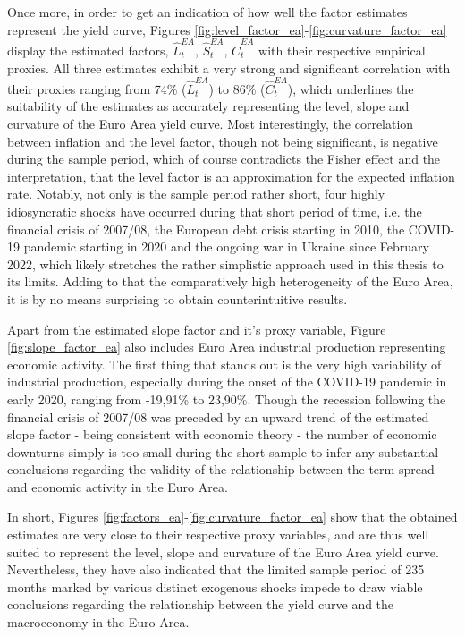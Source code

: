 Once more, in order to get an indication of how well the factor estimates represent the yield curve, Figures \ref{fig:level_factor_ea}-\ref{fig:curvature_factor_ea} display the estimated factors, $\hat{L}^{EA}_{t}$, $\hat{S}^{EA}_{t}$, $\hat{C}^{EA}_{t}$ with their respective empirical proxies. 
All three estimates exhibit a very strong and significant correlation with their proxies ranging from 74\% ($\hat{L}^{EA}_{t}$) to 86\% ($\hat{C}^{EA}_{t}$), which underlines the suitability of the estimates as accurately representing the level, slope and curvature of the Euro Area yield curve.
Most interestingly, the correlation between inflation and the level factor, though not being significant, is negative during the sample period, which of course contradicts the Fisher effect and the interpretation, that the level factor is an approximation for the expected inflation rate. Notably, not only is the sample period rather short, four highly idiosyncratic shocks have occurred during that short period of time, i.e. the financial crisis of 2007/08, the European debt crisis starting in 2010, the COVID-19 pandemic starting in 2020 and the ongoing war in Ukraine since February 2022, which likely stretches the rather simplistic approach used in this thesis to its limits. Adding to that the comparatively high heterogeneity of the Euro Area, it is by no means surprising to obtain counterintuitive results. 

Apart from the estimated slope factor and it's proxy variable, Figure \ref{fig:slope_factor_ea} also includes Euro Area industrial production representing economic activity. The first thing that stands out is the very high variability of industrial production, especially during the onset of the COVID-19 pandemic in early 2020, ranging from -19,91\% to 23,90\%. 
Though the recession following the financial crisis of 2007/08 was preceded by an upward trend of the estimated slope factor - being consistent with economic theory - the number of economic downturns simply is too small during the short sample to infer any substantial conclusions regarding the validity of the relationship between the term spread and economic activity in the Euro Area.

In short, Figures \ref{fig:factors_ea}-\ref{fig:curvature_factor_ea} show that the obtained estimates are very close to their respective proxy variables, and are thus well suited to represent the level, slope and curvature of the Euro Area yield curve. Nevertheless, they have also indicated that the limited sample period of 235 months marked by various distinct exogenous shocks impede to draw viable conclusions regarding the relationship between the yield curve and the macroeconomy in the Euro Area. 

